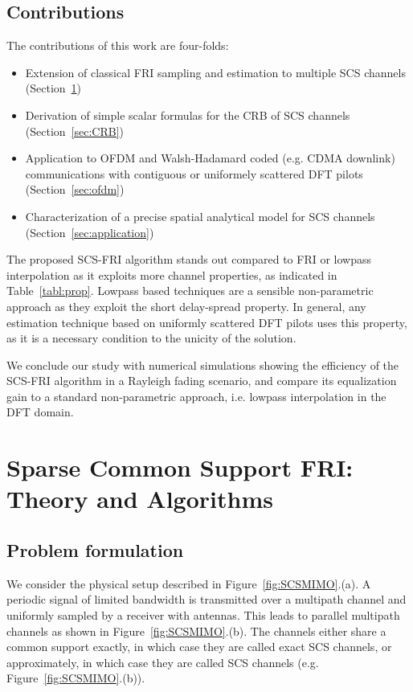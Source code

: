 \documentclass[journal,10pt]{IEEEtran}
\begin{document}
\subsection{Contributions}
The contributions of this work are four-folds:
\begin{itemize}
\item Extension of classical FRI sampling and estimation to multiple SCS channels (Section~\ref{sec:theory})
\item Derivation of simple scalar formulas for the CRB of SCS channels (Section~\ref{sec:CRB})
\item Application to OFDM and Walsh-Hadamard coded (e.g. CDMA downlink) communications with contiguous or uniformely scattered DFT pilots (Section~\ref{sec:ofdm})
\item Characterization of a precise spatial analytical model for SCS channels (Section~\ref{sec:application})
\end{itemize}

The proposed SCS-FRI algorithm stands out compared to FRI or lowpass interpolation as it exploits more channel properties, as indicated in Table~\ref{tabl:prop}. Lowpass based techniques are a sensible non-parametric approach as they exploit the short delay-spread property. In general, any estimation technique based on uniformly scattered DFT pilots uses this property, as it is a necessary condition to the unicity of the solution.

We conclude our study with numerical simulations showing the efficiency of the SCS-FRI algorithm in a Rayleigh fading scenario, and compare its equalization gain to a standard non-parametric approach, i.e. lowpass interpolation in the DFT domain.




\section{Sparse Common Support FRI: Theory and Algorithms}\label{sec:theory}

\subsection{Problem formulation}
We consider the physical setup described in Figure~\ref{fig:SCSMIMO}.(a). A periodic signal of limited bandwidth is transmitted over a multipath channel and uniformly sampled by a receiver with  antennas. This leads to  parallel multipath channels as shown in Figure~\ref{fig:SCSMIMO}.(b). The channels either share a common support exactly, in which case they are called exact SCS channels, or approximately, in which case they are called SCS channels (e.g. Figure~\ref{fig:SCSMIMO}.(b)).
\end{document}
